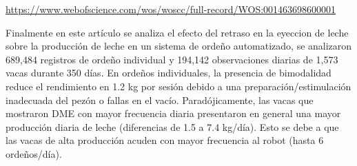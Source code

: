 \documentclass[11pt,letterpaper,DIV=12]{scrartcl}
\begin{document}
\url{https://www.webofscience.com/wos/woscc/full-record/WOS:001463698600001}

Finalmente en este artículo se analiza el efecto del retraso en la eyeccion de leche sobre la producción de leche en un sistema de ordeño automatizado, se analizaron 689,484 registros de ordeño individual y 194,142 observaciones diarias de 1,573 vacas durante 350 días. En ordeños individuales, la presencia de bimodalidad reduce el rendimiento en 1.2 kg por sesión debido a una preparación/estimulación inadecuada del pezón o fallas en el vacío. Paradójicamente, las vacas que mostraron DME con mayor frecuencia diaria presentaron en general una mayor producción diaria de leche (diferencias de 1.5 a 7.4 kg/día). Esto se debe a que las vacas de alta producción acuden con mayor frecuencia al robot (hasta 6 ordeños/día).

\printbibliography
\end{document}
